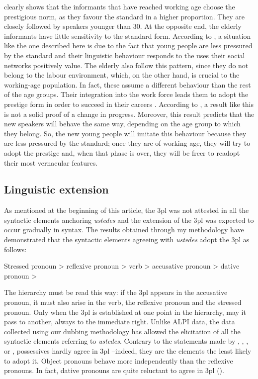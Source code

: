 \documentclass[output=paper]{LSP/langsci}
\begin{document}
 clearly shows that the informants that have reached working age choose the prestigious norm, as they favour the standard in a higher proportion. They are closely followed by speakers younger than 30. At the opposite end, the elderly informants have little sensitivity to the standard form. According to \citet{chambers_dialectology_1980}, a situation like the one described here is due to the fact that young people are less pressured by the standard and their linguistic behaviour responds to the uses their social networks positively value. The elderly also follow this pattern, since they do not belong to the labour environment, which, on the other hand, is crucial to the working-age population. In fact, these assume a different behaviour than the rest of the age groups. Their integration into the work force leads them to adopt the prestige form in order to succeed in their careers \citep{macaulay_language_1977,bourdieu_mercado_1978,seara_variacao_2000}. According to \citet{chambers_dialectology_1980}, a result like this is not a solid proof of a change in progress. Moreover, this result predicts that the new speakers will behave the same way, depending on the age group to which they belong. So, the new young people will imitate this behaviour because they are less pressured by the standard; once they are of working age, they will try to adopt the prestige and, when that phase is over, they will be freer to readopt their most vernacular features.

\subsection{Linguistic extension}
As mentioned at the beginning of this article, the 3pl was not attested in all the syntactic elements anchoring \textit{ustedes} and the extension of the 3pl was expected to occur gradually in syntax. The results obtained through my methodology have demonstrated that the syntactic elements agreeing with \textit{ustedes} adopt the 3pl as follows:

\begin{exe}
\ex Stressed pronoun {\textgreater} reflexive pronoun {\textgreater} verb {\textgreater} accusative pronoun {\textgreater} dative pronoun {\textgreater}
\end{exe}

The hierarchy must be read this way: if the 3pl appears in the accusative pronoun, it must also arise in the verb, the reflexive pronoun and the stressed pronoun. Only when the 3pl is established at one point in the hierarchy, may it pass to another, always to the immediate right. Unlike ALPI data, the data collected using our dubbing methodology has allowed the elicitation of all the syntactic elements referring to \textit{ustedes}. Contrary to the statements made by \citet{mondejar_verbo_1974}, \citet{lapesa_estudios_2000}, \citet{cano_historia_2004}, \citet{penny_variacion_2004} or \citet{menendez_pidal_historia_2005}, possessives hardly agree in 3pl –indeed, they are the elements the least likely to adopt it. Object pronouns behave more independently than the reflexive pronouns. In fact, dative pronouns are quite reluctant to agree in 3pl ().  
\end{document}
